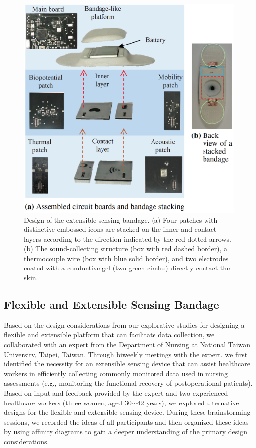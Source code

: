 \begin{figure}[!ht]
\centering
\includegraphics[width=14cm]{image/bio_fig1}
\caption{Design of the extensible sensing bandage. (a) Four patches with distinctive embossed icons are stacked on the inner and contact layers according to the direction indicated by the red dotted arrows. (b) The sound-collecting structure (box with red dashed border), a thermocouple wire (box with blue solid border), and two electrodes coated with a conductive gel (two green circles) directly contact the skin.}
\label{bandage_stacking}
\end{figure}


\subsection{Flexible and Extensible Sensing Bandage}
Based on the design considerations from our explorative studies for designing a flexible and extensible platform that can facilitate data collection, we collaborated with an expert from the Department of Nursing at National Taiwan University, Taipei, Taiwan. Through biweekly meetings with the expert, we first identified the necessity for an extensible sensing device that can assist healthcare workers in efficiently collecting commonly monitored data used in nursing assessments (e.g., monitoring the functional recovery of postoperational patients). Based on input and feedback provided by the expert and two experienced healthcare workers (three women, aged 30$\sim$42 years), we explored alternative designs for the flexible and extensible sensing device. During these brainstorming sessions, we recorded the ideas of all participants and then organized these ideas by using affinity diagrams to gain a deeper understanding of the primary design considerations.

